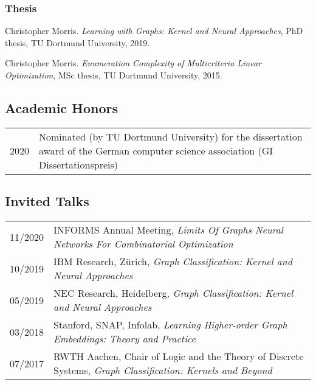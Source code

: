 \documentclass[11pt, a4paper]{scrartcl}
\begin{document}
\begin{thebibliography}{5}

\subsubsection*{Thesis}

Christopher Morris.
\emph{Learning with Graphs: Kernel and Neural Approaches}, PhD thesis, TU Dortmund University, 2019.

Christopher Morris.
\emph{Enumeration Complexity of Multicriteria Linear Optimization}, MSc thesis, TU Dortmund University, 2015.

	
\end{thebibliography}

\subsection*{Academic Honors}
\begin{tabular}{p{2.1cm}p{12.0cm}}
	2020& Nominated (by TU Dortmund University) for the dissertation award of the German computer science association (GI Dissertationspreis)\\
\end{tabular}

\subsection*{Invited Talks}
\begin{tabular}{p{2.1cm}p{12.0cm}}
11/2020&INFORMS Annual Meeting, \emph{Limits Of Graphs Neural Networks For Combinatorial Optimization} \\
10/2019&IBM Research, Zürich, \emph{Graph Classification: Kernel and Neural Approaches}\\
05/2019&NEC Research, Heidelberg, \emph{Graph Classification: Kernel and Neural Approaches}\\ 
03/2018&Stanford, SNAP, Infolab, \emph{Learning Higher-order Graph Embeddings: Theory and Practice}\\
07/2017&RWTH Aachen, Chair of Logic and the Theory of Discrete Systems, \emph{Graph Classification: Kernels and Beyond}\\

\end{tabular}
\end{document}
